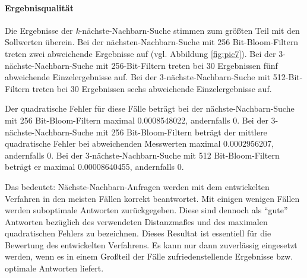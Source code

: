 \paragraph*{Ergebnisqualität}
Die Ergebnisse der \textit{k}-nächste-Nachbarn-Suche stimmen zum größten Teil mit den Sollwerten überein. Bei der nächsten-Nachbarn-Suche mit 256 Bit-Bloom-Filtern treten zwei abweichende Ergebnisse auf (vgl. Abbildung \ref{fig:pic7}). Bei der 3-nächste-Nachbarn-Suche mit 256-Bit-Filtern treten bei 30 Ergebnissen fünf abweichende Einzelergebnisse auf. Bei der 3-nächste-Nachbarn-Suche mit 512-Bit-Filtern treten bei 30 Ergebnissen sechs abweichende Einzelergebnisse auf. 

Der quadratische Fehler für diese Fälle beträgt bei der nächste-Nachbarn-Suche mit 256 Bit-Bloom-Filtern maximal 0.0008548022, andernfalls 0. Bei der 3-nächste-Nachbarn-Suche mit 256 Bit-Bloom-Filtern beträgt der mittlere quadratische Fehler bei abweichenden Messwerten maximal 0.0002956207, andernfalls 0. Bei der 3-nächste-Nachbarn-Suche mit 512 Bit-Bloom-Filtern beträgt er maximal 0.00008640455, andernfalls 0.

Das bedeutet: Nächste-Nachbarn-Anfragen werden mit dem entwickelten Verfahren in den meisten Fällen korrekt beantwortet. Mit einigen wenigen Fällen werden suboptimale Antworten zurückgegeben. Diese sind dennoch als "`gute"' Antworten bezüglich des verwendeten Distanzmaßes und des maximalen quadratischen Fehlers zu bezeichnen. Dieses Resultat ist essentiell für die Bewertung des entwickelten Verfahrens. Es kann nur dann zuverlässig eingesetzt werden, wenn es in einem Großteil der Fälle zufriedenstellende Ergebnisse bzw. optimale Antworten liefert. 
